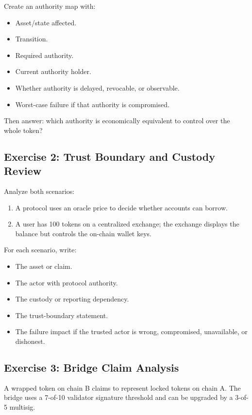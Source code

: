 Create an authority map with:

\begin{itemize}
\tightlist
\item
  Asset/state affected.
\item
  Transition.
\item
  Required authority.
\item
  Current authority holder.
\item
  Whether authority is delayed, revocable, or observable.
\item
  Worst-case failure if that authority is compromised.
\end{itemize}

Then answer: which authority is economically equivalent to control over
the whole token?

\subsection{Exercise 2: Trust Boundary and Custody Review}

Analyze both scenarios:

\begin{enumerate}
\def\labelenumi{\arabic{enumi}.}
\tightlist
\item
  A protocol uses an oracle price to decide whether accounts can borrow.
\item
  A user has 100 tokens on a centralized exchange; the exchange displays
  the balance but controls the on-chain wallet keys.
\end{enumerate}

For each scenario, write:

\begin{itemize}
\tightlist
\item
  The asset or claim.
\item
  The actor with protocol authority.
\item
  The custody or reporting dependency.
\item
  The trust-boundary statement.
\item
  The failure impact if the trusted actor is wrong, compromised,
  unavailable, or dishonest.
\end{itemize}

\subsection{Exercise 3: Bridge Claim Analysis}

A wrapped token on chain B claims to represent locked tokens on chain A.
The bridge uses a 7-of-10 validator signature threshold and can be
upgraded by a 3-of-5 multisig.

